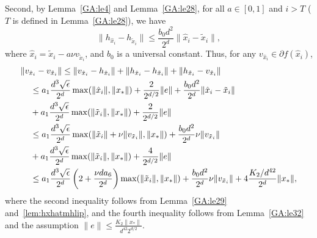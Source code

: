 \begin{enumerate}

Second, by Lemma~\ref{GA:le4} and Lemma~\ref{GA:le28}, for all $a \in [0, 1]$ and $i > T$ ($T$ is defined in Lemma~\ref{GA:le28}), we have
\begin{equation} \label{lem:hxhatmhlip}
\|h_{\hat{x}_{i}} - h_{\tilde{x}_{i}}\| \leq \frac{b_0 d^2}{2^d} \|\hat{x}_{i} - \tilde{x}_{i}\|,
\end{equation}
where $\hat{x}_{i} = \tilde{x}_{i} - a \nu {v}_{\tilde{x}_i}$, and $b_0$ is a universal constant.
Thus, for any $v_{\hat{x}_{i}} \in \partial f(\hat{x}_{i}) $,
\begin{align}
\hspace{0.4cm}&\hspace{-0.4cm}\|v_{\hat{x}_{i}} - {v}_{\tilde{x}_i}\|
%
\leq
\|v_{\hat{x}_{i}} - h_{\hat{x}_{i}}\| + \|h_{\hat{x}_{i}} - h_{\tilde{x}_{i}}\| + \|h_{\tilde{x}_{i}} - {v}_{\tilde{x}_i}\| \nonumber \\
%
&\leq
a_1 \frac{d^3 \sqrt{\epsilon}}{2^d} \max(\|\hat{x}_{i}\|, \|x_*\|) + \frac{2}{2^{d/2}} \|e\| + \frac{b_0 d^2}{2^d} \|\hat{x}_{i} - \tilde{x}_{i}\| \nonumber \\
&+ a_1 \frac{d^3 \sqrt{\epsilon}}{2^d} \max(\|\tilde{x}_{i}\|, \|x_*\|) + \frac{2}{2^{d/2}} \|e\| \nonumber \\
%
&\leq
a_1 \frac{d^3 \sqrt{\epsilon}}{2^d} \max(\|\tilde{x}_{i}\| + \nu \|{v}_{\tilde{x}_i}\|, \|x_*\|) + \frac{b_0 d^2}{2^d} \nu \|{v}_{\tilde{x}_i}\| \nonumber \\
&+ a_1 \frac{d^3 \sqrt{\epsilon}}{2^d} \max(\|\tilde{x}_{i}\|, \|x_*\|) + \frac{4}{2^{d/2}} \|e\|  \nonumber \\
&\leq
a_1 \frac{d^3 \sqrt{\epsilon}}{2^d} \left(2 + \frac{\nu d a_6}{2^d}  \right) \max(\|\tilde{x}_{i}\|, \|x_*\|) + \frac{b_0 d^2}{2^d} \nu \|{v}_{\tilde{x}_i}\| + 4 \frac{K_2/d^{42}}{2^{d}} \|x_*\|, \label{eta-minus-vtilde}
\end{align}
where the second inequality follows from Lemma~\ref{GA:le29} and~\eqref{lem:hxhatmhlip},
and the fourth inequality follows from Lemma~\ref{GA:le32}
and the assumption $\|e\| \leq \frac{K_2 \|x_*\|}{d^{42} 2^{d/2}}$.


\end{enumerate}
